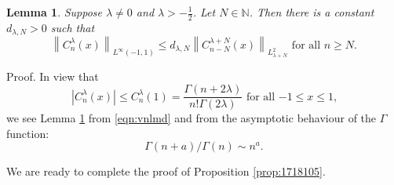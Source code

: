 \documentclass[12pt]{article}
\newcommand{\myabs}[1]{\left|#1\right|}
\newcommand{\N}{\mathbb{N}}
\numberwithin{equation}{section}
\newcommand{\mynorm}[1]{\left\|#1\right\|}
\newenvironment{proof*}[1]{\noindent\textbf{#1\ }}{\hspace*{\fill}$\Box$\medskip}
\newtheorem{lemma}[corollary]{Lemma}
\begin{document}
\begin{lemma}
	Suppose $\lambda\neq0$ and $\lambda>-\frac{1}{2}$. Let $N\in\N$. Then there is a constant $d_{\lambda,N}>0$ such that \begin{equation*}
		\mynorm{C_n^\lambda(x)}_{L^\infty(-1,1)}\le d_{\lambda,N}\mynorm{C^{\lambda+N}_{n-N}(x)}_{L^2_{\lambda+N}}\mbox{ for all $n\ge N$.}
	\end{equation*}
	\label{lem:1718109}
\end{lemma}
\begin{proof*}{Proof.}
	In view that\begin{equation*}
		\myabs{C_n^\lambda(x)}\le C_n^\lambda(1)=\frac{\Gamma(n+2\lambda)}{n!\Gamma(2\lambda)}\mbox{ for all $-1\le x\le 1$,}
	\end{equation*}we see Lemma \ref{lem:1718109} from \eqref{eqn:vnlmd} and from the asymptotic behaviour of the $\Gamma$ function:\begin{equation*}
		\Gamma(n+a)/\Gamma(n)\sim n^a.
	\end{equation*}
\end{proof*}

We are ready to complete the proof of Proposition \ref{prop:1718105}.
\end{document}
